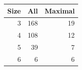 \begin{tabular}{rrr}
\toprule
Size & All & Maximal \\
\midrule
3 & 168 & 19 \\
4 & 108 & 12 \\
5 & 39 & 7 \\
6 & 6 & 6 \\
\bottomrule
\end{tabular}

